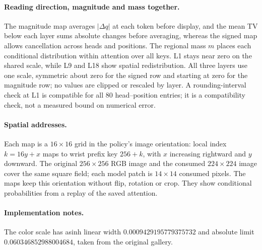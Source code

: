\paragraph{Reading direction, magnitude and mass together.}
The magnitude map averages $|\Delta q|$ at each token before display, and the mean TV below each layer sums absolute changes before averaging, whereas the signed map allows cancellation across heads and positions. The regional mass $m$ places each conditional distribution within attention over all keys. L1 stays near zero on the shared scale, while L9 and L18 show spatial redistribution. All three layers use one scale, symmetric about zero for the signed row and starting at zero for the magnitude row; no values are clipped or rescaled by layer. A rounding-interval check at L1 is compatible for all 80 head--position entries; it is a compatibility check, not a measured bound on numerical error.

\paragraph{Spatial addresses.}
Each map is a $16\times16$ grid in the policy's image orientation: local index $k=16y+x$ maps to wrist prefix key $256+k$, with $x$ increasing rightward and $y$ downward. The original $256\times256$ RGB image and the consumed $224\times224$ image cover the same square field; each model patch is $14\times14$ consumed pixels. The maps keep this orientation without flip, rotation or crop. They show conditional probabilities from a replay of the saved attention.

\paragraph{Implementation notes.}
The color scale has asinh linear width $0.0009429195779375732$ and absolute limit $0.060346852988004684$, taken from the original gallery.
